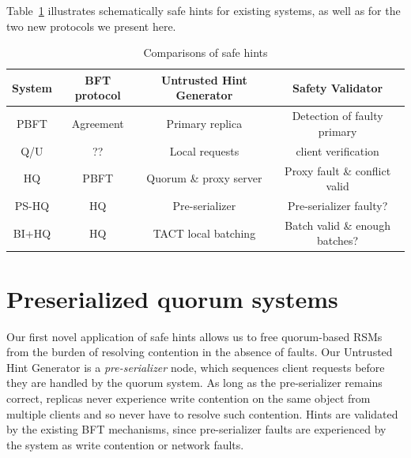 \documentclass[twocolumn,10pt]{article}
\begin{document}
Table~\ref{tab:examples}
illustrates schematically safe hints for existing systems, as well as
for the two new protocols we present here.


\begin{table}
\begin{center}
\begin{tabular}{|c|c|c|c|}
\hline
System & BFT protocol & Untrusted Hint Generator & Safety Validator \\
\hline
PBFT & Agreement & Primary replica & Detection of faulty primary \\
\hline 
Q/U & ?? & Local requests & client verification \\
\hline
HQ & PBFT & Quorum \& proxy server & Proxy fault \& conflict valid \\
\hline
PS-HQ & HQ & Pre-serializer & Pre-serializer faulty? \\
\hline 
BI+HQ & HQ & TACT local batching & Batch valid \& enough batches? \\
\hline
\end{tabular}
\end{center}
\caption{Comparisons of safe hints}
\label{tab:examples} 
\end{table}





\section{Preserialized quorum systems}
\label{sec:preserialization}

Our first novel application of safe hints allows us to free quorum-based
RSMs from the burden of resolving contention in the absence of faults.
Our Untrusted Hint Generator is a \emph{pre-serializer} node, which
sequences client requests before they are handled by the quorum
system.  As long as the pre-serializer remains correct,
replicas never experience write contention on the same object from
multiple clients and so never have to resolve such
contention.  Hints are validated by the existing BFT mechanisms, since
pre-serializer faults are experienced by the system as write
contention or network faults. 
\end{document}

